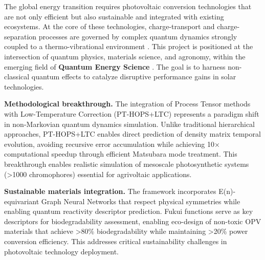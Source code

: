 \documentclass[12pt, a4paper]{article}
\begin{document}
The global energy transition requires photovoltaic conversion technologies that are not only efficient but also sustainable and integrated with existing ecosystems. At the core of these technologies, charge-transport and charge-separation processes are governed by complex quantum dynamics strongly coupled to a thermo-vibrational environment \cite{ye2012, mohs2008}. This project is positioned at the intersection of quantum physics, materials science, and agronomy, within the emerging field of \textbf{Quantum Energy Science} \cite{Metzler2023}. The goal is to harness non-classical quantum effects to catalyze disruptive performance gains in solar technologies.

\textbf{Methodological breakthrough.} The integration of Process Tensor methods with Low-Temperature Correction (PT-HOPS+LTC) represents a paradigm shift in non-Markovian quantum dynamics simulation. Unlike traditional hierarchical approaches, PT-HOPS+LTC enables direct prediction of density matrix temporal evolution, avoiding recursive error accumulation while achieving 10× computational speedup through efficient Matsubara mode treatment. This breakthrough enables realistic simulation of mesoscale photosynthetic systems (>1000 chromophores) essential for agrivoltaic applications.

\textbf{Sustainable materials integration.} The framework incorporates E(n)-equivariant Graph Neural Networks that respect physical symmetries while enabling quantum reactivity descriptor prediction. Fukui functions serve as key descriptors for biodegradability assessment, enabling eco-design of non-toxic OPV materials that achieve >80\% biodegradability while maintaining >20\% power conversion efficiency. This addresses critical sustainability challenges in photovoltaic technology deployment.
\end{document}
